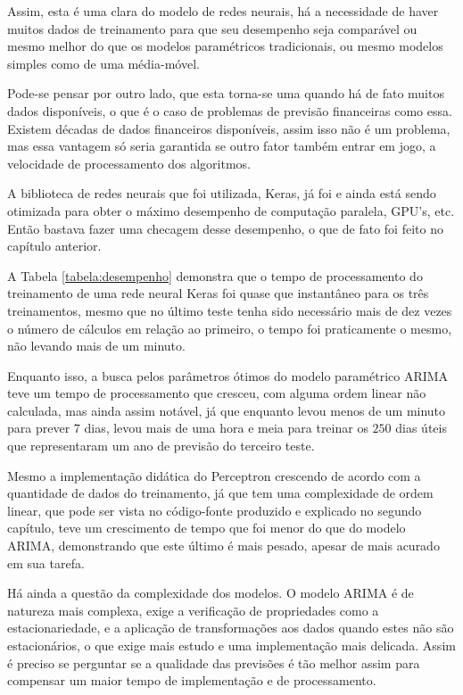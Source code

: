 Assim, esta é uma clara  do modelo de redes neurais, há a necessidade de haver muitos dados de treinamento para que seu desempenho seja comparável ou mesmo melhor do que os modelos paramétricos tradicionais, ou mesmo modelos simples como de uma média-móvel.

Pode-se pensar por outro lado, que esta torna-se uma  quando há de fato muitos dados disponíveis, o que é o caso de problemas de previsão financeiras como essa. Existem décadas de dados financeiros disponíveis, assim isso não é um problema, mas essa vantagem só seria garantida se outro fator também entrar em jogo, a velocidade de processamento dos algoritmos.

A biblioteca de redes neurais que foi utilizada, Keras, já foi e ainda está sendo otimizada para obter o máximo desempenho de computação paralela, GPU's, etc. Então bastava fazer uma checagem desse desempenho, o que de fato foi feito no capítulo anterior.

A Tabela \ref{tabela:desempenho} demonstra que o tempo de processamento do treinamento de uma rede neural Keras foi quase que instantâneo para os três treinamentos, mesmo que no último teste tenha sido necessário mais de dez vezes o número de cálculos em relação ao primeiro, o tempo foi praticamente o mesmo, não levando mais de um minuto.

Enquanto isso, a busca pelos parâmetros ótimos do modelo paramétrico ARIMA teve um tempo de processamento que cresceu, com alguma ordem linear não calculada, mas ainda assim notável, já que enquanto levou menos de um minuto para prever $7$ dias, levou mais de uma hora e meia para treinar os $250$ dias úteis que representaram um ano de previsão do terceiro teste.

Mesmo a implementação didática do Perceptron crescendo de acordo com a quantidade de dados do treinamento, já que tem uma complexidade de ordem linear, que pode ser vista no código-fonte produzido e explicado no segundo capítulo, teve um crescimento de tempo que foi menor do que do modelo ARIMA, demonstrando que este último é mais pesado, apesar de mais acurado em sua tarefa.

Há ainda a questão da complexidade dos modelos. O modelo ARIMA é de natureza mais complexa, exige a verificação de propriedades como a estacionariedade, e a aplicação de transformações aos dados quando estes não são estacionários, o que exige mais estudo e uma implementação mais delicada. Assim é preciso se perguntar se a qualidade das previsões é tão melhor assim para compensar um maior tempo de implementação e de processamento.

